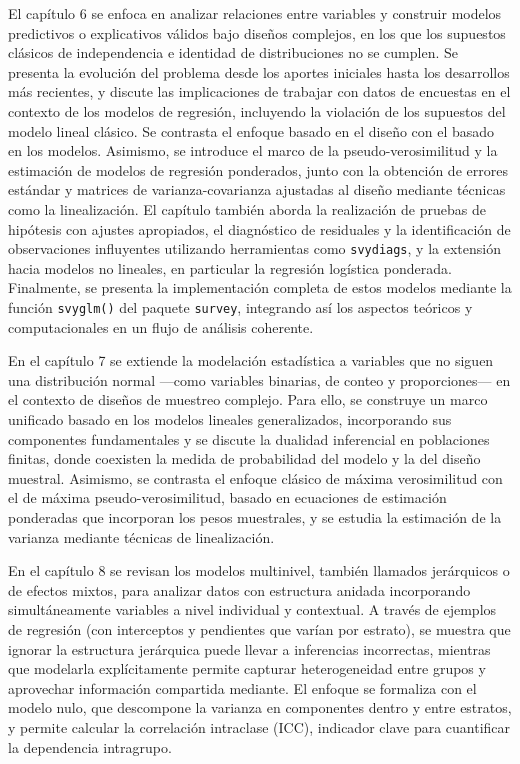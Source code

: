 \documentclass[
  spanish,
  12pt,
]{book}
\begin{document}
El capítulo 6 se enfoca en analizar relaciones entre variables y construir modelos predictivos o explicativos válidos bajo diseños complejos, en los que los supuestos clásicos de independencia e identidad de distribuciones no se cumplen. Se presenta la evolución del problema desde los aportes iniciales hasta los desarrollos más recientes, y discute las implicaciones de trabajar con datos de encuestas en el contexto de los modelos de regresión, incluyendo la violación de los supuestos del modelo lineal clásico. Se contrasta el enfoque basado en el diseño con el basado en los modelos. Asimismo, se introduce el marco de la pseudo-verosimilitud y la estimación de modelos de regresión ponderados, junto con la obtención de errores estándar y matrices de varianza-covarianza ajustadas al diseño mediante técnicas como la linealización. El capítulo también aborda la realización de pruebas de hipótesis con ajustes apropiados, el diagnóstico de residuales y la identificación de observaciones influyentes utilizando herramientas como \texttt{svydiags}, y la extensión hacia modelos no lineales, en particular la regresión logística ponderada. Finalmente, se presenta la implementación completa de estos modelos mediante la función \texttt{svyglm()} del paquete \texttt{survey}, integrando así los aspectos teóricos y computacionales en un flujo de análisis coherente.

En el capítulo 7 se extiende la modelación estadística a variables que no siguen una distribución normal ---como variables binarias, de conteo y proporciones--- en el contexto de diseños de muestreo complejo. Para ello, se construye un marco unificado basado en los modelos lineales generalizados, incorporando sus componentes fundamentales y se discute la dualidad inferencial en poblaciones finitas, donde coexisten la medida de probabilidad del modelo y la del diseño muestral. Asimismo, se contrasta el enfoque clásico de máxima verosimilitud con el de máxima pseudo-verosimilitud, basado en ecuaciones de estimación ponderadas que incorporan los pesos muestrales, y se estudia la estimación de la varianza mediante técnicas de linealización.

En el capítulo 8 se revisan los modelos multinivel, también llamados jerárquicos o de efectos mixtos, para analizar datos con estructura anidada incorporando simultáneamente variables a nivel individual y contextual. A través de ejemplos de regresión (con interceptos y pendientes que varían por estrato), se muestra que ignorar la estructura jerárquica puede llevar a inferencias incorrectas, mientras que modelarla explícitamente permite capturar heterogeneidad entre grupos y aprovechar información compartida mediante. El enfoque se formaliza con el modelo nulo, que descompone la varianza en componentes dentro y entre estratos, y permite calcular la correlación intraclase (ICC), indicador clave para cuantificar la dependencia intragrupo.
\end{document}
